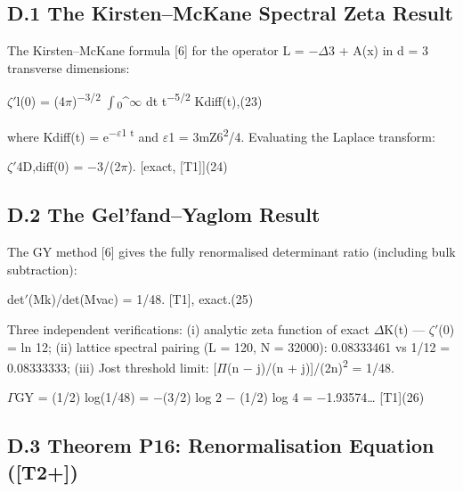 \documentclass[11pt,letterpaper]{article}
\begin{document}
\subsection*{D.1  The Kirsten--McKane Spectral Zeta Result}

\noindent The Kirsten--McKane formula [6] for the operator L = $-$$\Delta$3 + A(x) in d = 3 transverse dimensions:

\begingroup\centering $\zeta$$'$l(0) = (4$\pi$)\textsuperscript{$-$3/2} $\int$\textsubscript{0}\textasciicircum{}$\infty$ dt t\textsuperscript{$-$5/2} Kdiff(t),\hspace{2em}(23)\par\endgroup

\noindent where Kdiff(t) = e\textsuperscript{$-$$\varepsilon$1 t} and $\varepsilon$1 = 3mZ6\textsuperscript{2}/4. Evaluating the Laplace transform:

\begingroup\centering $\zeta$$'$4D,diff(0) = $-$3/(2$\pi$).   [exact, [T1]]\hspace{2em}(24)\par\endgroup

\subsection*{D.2  The Gel'fand--Yaglom Result}

\noindent The GY method [6] gives the fully renormalised determinant ratio (including bulk subtraction):

\begingroup\centering det$'$(Mk)/det(Mvac) = 1/48.   [T1], exact.\hspace{2em}(25)\par\endgroup

\noindent Three independent verifications: (i) analytic zeta function of exact $\Delta$K(t) --- $\zeta$$'$(0) = ln 12; (ii) lattice spectral pairing (L = 120, N = 32000): 0.08333461 vs 1/12 = 0.08333333; (iii) Jost threshold limit: [$\Pi$(n $-$ j)/(n + j)]/(2n)\textsuperscript{2} = 1/48.

\begingroup\centering $\Gamma$GY = (1/2) log(1/48) = $-$(3/2) log 2 $-$ (1/2) log 4 = $-$1.93574\ldots{}   [T1]\hspace{2em}(26)\par\endgroup

\subsection*{D.3  Theorem P16: Renormalisation Equation ([T2+])}
\end{document}
